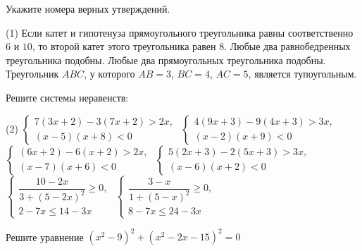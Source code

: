 \begin{class}[number=2]
\begin{listofex}
\begin{tasks}
		\end{tasks}
		\item Укажите номера верных утверждений.
		\begin{tasks}(1)
			\task Если катет и гипотенуза прямоугольного треугольника равны соответственно \( 6 \) и \( 10 \), то второй катет этого треугольника равен \( 8 \).
			\task Любые два равнобедренных треугольника подобны.
			\task Любые два прямоугольных треугольника подобны.
			\task Треугольник \( ABC \), у которого \( AB=3 \), \( BC=4 \), \( AC=5 \), является тупоугольным.
		\end{tasks}
		\item Решите системы неравенств:
		\begin{tasks}(2)
			\task \( \begin{cases}
				 7(3x+2)-3(7x+2)>2x ,\\
				(x-5)(x+8)<0
			\end{cases} \)
			\task \( \begin{cases}
				4(9x+3)-9(4x+3)>3x,\\
				(x-2)(x+9)<0
			\end{cases} \)
			\task \( \begin{cases}
			(6x+2)-6(x+2)>2x,\\
			(x-7)(x+6)<0
			\end{cases} \)
			\task \( \begin{cases}
			5(2x+3)-2(5x+3)>3x,\\
			(x-6)(x+2)<0
			\end{cases} \)
			\task \( \begin{cases}
			\dfrac{10-2x}{3+(5-2x)^2}\ge0,\\
			2-7x\le14-3x
			\end{cases} \)
			\task \( \begin{cases}
			\dfrac{3-x}{1+(5-x)^2}\ge0,\\
			8-7x\le24-3x
			\end{cases} \)
		\end{tasks}
		\item Решите уравнение \( (x^2-9)^2+(x^2-2x-15)^2=0 \)
	\end{listofex}
\end{class}

